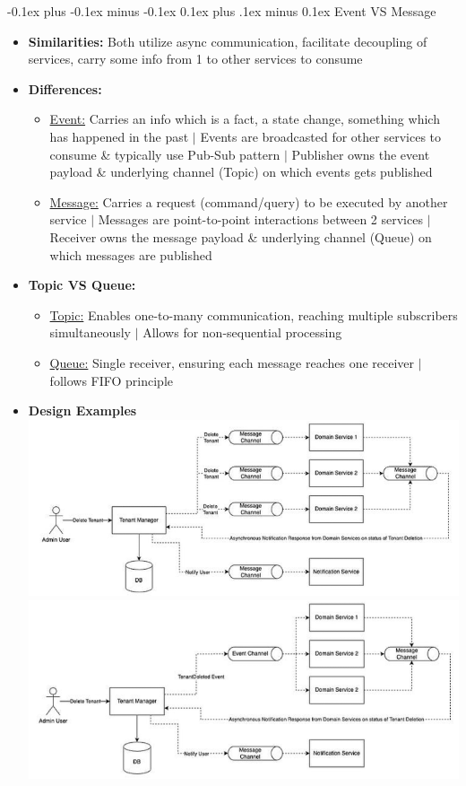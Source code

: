 \documentclass[landscape]{article}
\makeatletter
\renewcommand{\subsection}{\@startsection{subsection}{2}{0mm}%
  {-0.1ex plus -0.1ex minus -0.1ex}%
  {0.1ex plus .1ex minus 0.1ex}%
{\normalfont\scriptsize\bfseries}}
\makeatother
\begin{document}
\begin{multicols*}{5}
    \subsection{Event VS Message}
    \begin{itemize}
      \item \textbf{Similarities:} Both utilize async communication, facilitate decoupling of services, carry some info from 1 to other services to consume
      \item \textbf{Differences:}
      \begin{itemize}
        \item \underline{Event:} Carries an info which is a fact, a state change, something which has happened in the past $|$ Events are broadcasted for other services to consume \& typically use Pub-Sub pattern $|$ Publisher owns the event payload \& underlying channel (Topic) on which events gets published
        \item \underline{Message:} Carries a request (command/query) to be executed by another service $|$ Messages are point-to-point interactions between 2 services $|$ Receiver owns the message payload \& underlying channel (Queue) on which messages are published
      \end{itemize}
      \item \textbf{Topic VS Queue:}
      \begin{itemize}
        \item \underline{Topic:} Enables one-to-many communication, reaching multiple subscribers simultaneously $|$ Allows for non-sequential processing
        \item \underline{Queue:} Single receiver, ensuring each message reaches one receiver $|$ follows FIFO principle
      \end{itemize}
      \item \textbf{Design Examples}
      \includegraphics[width=0.85\linewidth]{5_design_example.png}
      \includegraphics[width=0.85\linewidth]{6_design_example.png}
    \end{itemize}


\end{multicols*}
\end{document}

